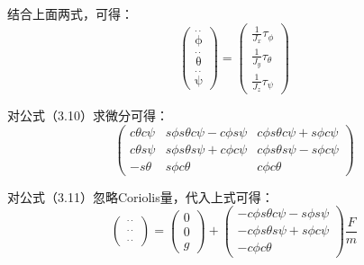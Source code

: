 结合上面两式，可得：
\begin{equation}
\left( \begin{array}{l}
\mathop \phi \limits^{ \cdot  \cdot } \\
\mathop \theta \limits^{ \cdot  \cdot } \\
\mathop \psi \limits^{ \cdot  \cdot }
\end{array} \right) = \left( \begin{array}{l}
\frac{1}{{{J_x}}}{\tau _\phi }\\
\frac{1}{{{J_y}}}{\tau _\theta }\\
\frac{1}{{{J_z}}}{\tau _\psi }
\end{array} \right)
\end{equation}

对公式（3.10）求微分可得：
\[\left( {\begin{array}{*{20}{c}}
{c\theta c\psi }&{s\phi s\theta c\psi  - c\phi s\psi }&{c\phi s\theta c\psi  + s\phi c\psi }\\
{c\theta s\psi }&{s\phi s\theta s\psi  + c\phi c\psi }&{c\phi s\theta s\psi  - s\phi c\psi }\\
{ - s\theta }&{s\phi c\theta }&{c\phi c\theta }
\end{array}} \right)\]

对公式（3.11）忽略Coriolis量，代入上式可得：
\[\left( \begin{array}{l}
\mathop {{p_n}}\limits^{ \cdot  \cdot } \\
\mathop {{p_e}}\limits^{ \cdot  \cdot } \\
\mathop {{p_d}}\limits^{ \cdot  \cdot }
\end{array} \right) = \left( \begin{array}{l}
0\\
0\\
g
\end{array} \right) + \left( \begin{array}{c}
 - c\phi s\theta c\psi  - s\phi s\psi \\
 - c\phi s\theta s\psi  + s\phi c\psi \\
 - c\phi c\theta
\end{array} \right)\frac{F}{m}\]

